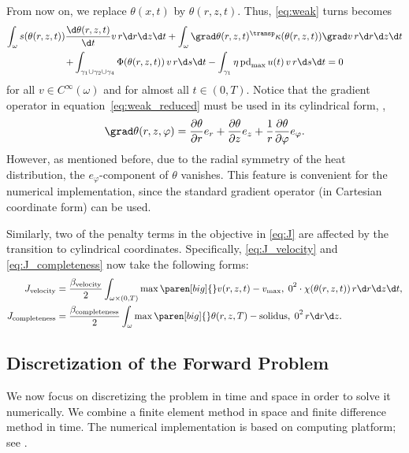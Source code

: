 From now on, we replace $\theta(x,t)$ by $\theta(r,z,t)$. 
Thus, \eqref{eq:weak} turns becomes
\begin{multline} \label{eq:weak_reduced}
	\int_\omega s(\theta(r,z,t)) \frac{\d \theta(r,z,t)}{\d t} v \, r \d r \d z \d t
	+
	\int_\omega \grad\theta(r,z,t)^\transp \kappa(\theta(r,z,t)) \grad v \, r \d r \d z \d t 
	\\
	+
	\int_{\gamma_1 \cup \gamma_2 \cup \gamma_4} \Phi(\theta(r,z,t)) \, v \, r \d s \d t -
	\int_{\gamma_1} \eta \, \text{pd}_{\max} \, u(t) \, v \, r \d s \d t 
	= 
	0
\end{multline}
for all $v \in C^\infty(\omega)$ and for almost all $t \in (0,T)$.
Notice that the gradient operator in equation~\eqref{eq:weak_reduced} must be used in its cylindrical form, \ie,
\begin{equation*}
	\grad \theta(r,z,\varphi) 
	=
	\frac{\partial \theta}{\partial r} e_r
	+
	\frac{\partial \theta}{\partial z} e_z
	+
	\frac{1}{r} \frac{\partial \theta}{\partial \varphi} e_{\varphi}
	.
\end{equation*}
However, as mentioned before, due to the radial symmetry of the heat distribution, the $e_{\varphi}$-component of $\theta$ vanishes. 
This feature is convenient for the numerical implementation, since the standard gradient operator (in Cartesian coordinate form) can be used.

Similarly, two of the penalty terms in the objective in \eqref{eq:J} are affected by the transition to cylindrical coordinates.
Specifically, \eqref{eq:J_velocity} and \eqref{eq:J_completeness} now take the following forms:
\begin{align}
	\label{eq:J_velocity_r}
	J_\textup{velocity} 
	&
	=
	\frac{\beta_\textup{velocity}}{2} \int_{\omega \times (0,T)} \max \paren[big]\{\}{v(r,z,t) - v_{\max}, \; 0}^2 \cdot \chi(\theta(r,z,t)) \, r \d r \d z \d t
	, 
	\\
	\label{eq:J_completeness_r}
	J_\textup{completeness} 
	&
	=
	\frac{\beta_\textup{completeness}}{2} \int_{\omega} \max \paren[big]\{\}{\theta(r,z,T) - \text{solidus}, \; 0}^2 \, r \d r \d z
	.
\end{align}


\subsection{Discretization of the Forward Problem}

We now focus on discretizing the problem in time and space in order to solve it numerically. 
We combine a finite element method in space and finite difference method in time. 
The numerical implementation is based on \fenics computing platform; see \cite{LoggMardalWells:2012:1}.

